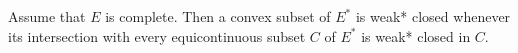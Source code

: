 Assume that $E$ is complete. Then a convex subset of $E^*$ is weak* closed whenever its intersection with every equicontinuous subset $C$ of $E^*$ is weak* closed in $C$.
